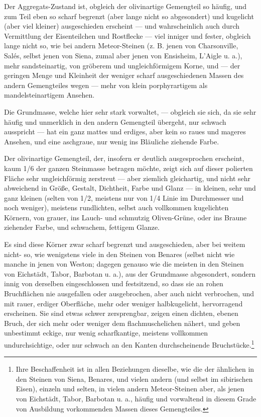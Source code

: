 \documentclass[a4paper, 11pt, oneside, german]{article}
\begin{document}
Der Aggregats-Zustand ist, obgleich der olivinartige Gemengteil so häufig, und zum Teil eben so scharf begrenzt (aber lange nicht so abgesondert) und kugelicht (aber viel kleiner) ausgeschieden erscheint --- und wahrscheinlich auch durch Vermittlung der Eisenteilchen und Rostflecke --- viel inniger und fester, obgleich lange nicht so, wie bei andern Meteor-Steinen (z. B. jenen von Charsonville, Salés, selbst jenen von Siena, zumal aber jenen von Ensisheim, L'Aigle u. a.), mehr sandsteinartig, von gröberem und ungleichförmigem Korne, und --- der geringen Menge und Kleinheit der weniger scharf ausgeschiedenen Massen des andern Gemengteiles wegen --- mehr von klein porphyrartigem als mandelsteinartigem Ansehen.

Die Grundmasse, welche hier sehr stark vorwaltet, --- obgleich sie sich, da sie sehr häufig und unmerklich in den andern Gemengteil übergeht, nur schwach ausspricht --- hat ein ganz mattes und erdiges, aber kein so raues und mageres Ansehen, und eine aschgraue, nur wenig ins Bläuliche ziehende Farbe.

Der olivinartige Gemengteil, der, insofern er deutlich ausgesprochen erscheint, kaum 1/6 der ganzen Steinmasse betragen möchte, zeigt sich auf dieser polierten Fläche sehr ungleichförmig zerstreut --- aber ziemlich gleichartig, und nicht sehr abweichend in Größe, Gestalt, Dichtheit, Farbe und Glanz --- in kleinen, sehr und ganz kleinen (selten von 1/2, meistens nur von 1/4 Linie im Durchmesser und noch weniger), meistens rundlichten, selbst auch vollkommen kugelichten Körnern, von grauer, ins Lauch- und schmutzig Oliven-Grüne, oder ins Braune ziehender Farbe, und schwachem, fettigem Glanze.

Es sind diese Körner zwar scharf begrenzt und ausgeschieden, aber bei weitem nicht- so, wie wenigstens viele in den Steinen von Benares (selbst nicht wie manche in jenen von Weston; dagegen genauso wie die meisten in den Steinen von Eichstädt, Tabor, Barbotan u. a.), aus der Grundmasse abgesondert, sondern innig von derselben eingeschlossen und festsitzend, so dass sie an rohen Bruchflächen nie ausgefallen oder ausgebrochen, aber auch nicht verbrochen, und mit rauer, erdiger Oberfläche, mehr oder weniger halbkugelicht, hervorragend erscheinen. Sie sind etwas schwer zersprengbar, zeigen einen dichten, ebenen Bruch, der sich mehr oder weniger dem flachmuschelichen nähert, und geben unbestimmt eckige, nur wenig scharfkantige, meistens vollkommen undurchsichtige, oder nur schwach an den Kanten durchscheinende Bruchstücke.\footnote{Ihre Beschaffenheit ist in allen Beziehungen dieselbe, wie die der ähnlichen in den Steinen von Siena, Benares, und vielen andern (und selbst im sibirischen Eisen), einzeln und selten, in vielen andern Meteor-Steinen aber, als jenen von Eichstädt, Tabor, Barbotan u. a., häufig und vorwaltend in diesem Grade von Ausbildung vorkommenden Massen dieses Gemengteiles.}
\end{document}
